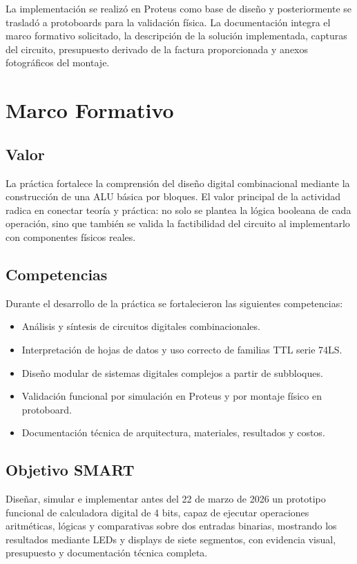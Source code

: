 \documentclass[12pt,a4paper]{article}
\begin{document}
La implementación se realizó en Proteus como base de diseño y posteriormente se trasladó a protoboards para la validación física. La documentación integra el marco formativo solicitado, la descripción de la solución implementada, capturas del circuito, presupuesto derivado de la factura proporcionada y anexos fotográficos del montaje.

\section{Marco Formativo}

\subsection{Valor}
La práctica fortalece la comprensión del diseño digital combinacional mediante la construcción de una ALU básica por bloques. El valor principal de la actividad radica en conectar teoría y práctica: no solo se plantea la lógica booleana de cada operación, sino que también se valida la factibilidad del circuito al implementarlo con componentes físicos reales.

\subsection{Competencias}
Durante el desarrollo de la práctica se fortalecieron las siguientes competencias:
\begin{itemize}[leftmargin=1.2cm]
    \item Análisis y síntesis de circuitos digitales combinacionales.
    \item Interpretación de hojas de datos y uso correcto de familias TTL serie 74LS.
    \item Diseño modular de sistemas digitales complejos a partir de subbloques.
    \item Validación funcional por simulación en Proteus y por montaje físico en protoboard.
    \item Documentación técnica de arquitectura, materiales, resultados y costos.
\end{itemize}

\subsection{Objetivo SMART}
Diseñar, simular e implementar antes del 22 de marzo de 2026 un prototipo funcional de calculadora digital de 4 bits, capaz de ejecutar operaciones aritméticas, lógicas y comparativas sobre dos entradas binarias, mostrando los resultados mediante LEDs y displays de siete segmentos, con evidencia visual, presupuesto y documentación técnica completa.
\end{document}
